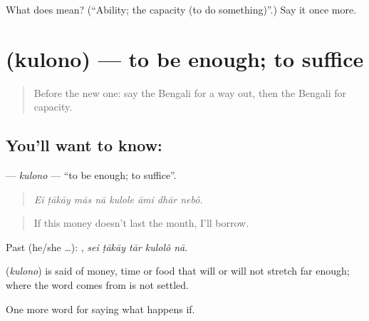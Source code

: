 \begin{tcolorbox}[breakable,colback=teal!4,colframe=teal!35!black,title={Before you move on}]
What does  mean? (\textquotedblleft{}Ability; the capacity (to do something)\textquotedblright{}.) Say it once more.
\end{tcolorbox}
\section[\texorpdfstring{\bn{কুলোনো} (kulono)}{কুলোনো (kulono)}]{ (kulono) — to be enough; to suffice}

\label{lesson:BN-C528-kulono}



\begin{quote}
Before the new one: say the Bengali for a way out, then the Bengali for capacity.
\end{quote}

\subsection*{You'll want to know: }
\textbf{} — \emph{kulono} — \textquotedblleft{}to be enough; to suffice\textquotedblright{}.

\begin{quote}
       
\end{quote}

\begin{quote}
\emph{Ei ṭākāy mās nā kulole āmi dhār nebô.}
\end{quote}

\begin{quote}
If this money doesn't last the month, I'll borrow.
\end{quote}

Past (he/she …):     , \emph{sei ṭākāy tār kulolô nā}.

\begin{cousinweb}
\textbf{} (\emph{kulono}) is said of money, time or food that will or will not stretch far enough; where the word comes from is not settled.
\end{cousinweb}

\begin{grammarlens}[title={What you've built}]
One more word for saying what happens if.
\end{grammarlens}

